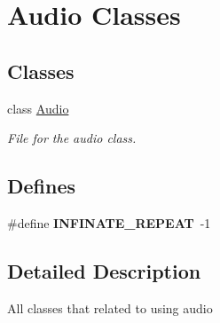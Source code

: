 \hypertarget{group__audioclasses}{
\section{Audio Classes}
\label{group__audioclasses}
}
\subsection*{Classes}
\begin{CompactItemize}
\item 
class \hyperlink{class_audio}{Audio}
\begin{CompactList}\small\item\em File for the audio class. \item\end{CompactList}\end{CompactItemize}
\subsection*{Defines}
\begin{CompactItemize}
\item 
\hypertarget{group__audioclasses_ga8aa32a08a79390b6f52cf7631f5aace}{
\#define \textbf{INFINATE\_\-REPEAT}~-1}
\label{group__audioclasses_ga8aa32a08a79390b6f52cf7631f5aace}

\end{CompactItemize}


\subsection{Detailed Description}
All classes that related to using audio 